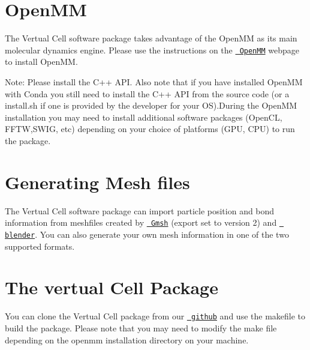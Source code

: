 \section*{Open\+MM}

The Vertual Cell software package takes advantage of the Open\+MM as its main molecular dynamics engine. Please use the instructions on the \href{http://openmm.org}{\texttt{ Open\+MM}} webpage to install Open\+MM.

Note\+: Please install the C++ A\+PI. Also note that if you have installed Open\+MM with \textquotesingle{}Conda\textquotesingle{} you still need to install the C++ A\+PI from the source code (or a install.\+sh if one is provided by the developer for your OS).During the Open\+MM installation you may need to install additional software packages (Open\+CL, F\+F\+TW,S\+W\+IG, etc) depending on your choice of platforms (G\+PU, C\+PU) to run the package.

\section*{Generating Mesh files}

The Vertual Cell software package can import particle position and bond information from meshfiles created by \href{http://gmsh.info}{\texttt{ Gmsh}} (export set to version 2) and \href{https://www.blender.org}{\texttt{ blender}}. You can also generate your own mesh information in one of the two supported formats.

\section*{The vertual Cell Package}

You can clone the Vertual Cell package from our \href{https://github.com/afarnudi/Membrane_OBJ}{\texttt{ github}} and use the makefile to build the package. Please note that you may need to modify the make file depending on the openmm installation directory on your machine. 
